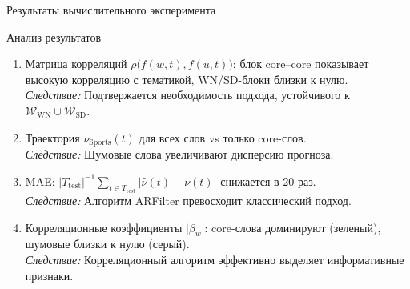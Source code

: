 \documentclass{beamer}
\begin{document}
\begin{frame}{Результаты вычислительного эксперимента}
\begin{block}{Анализ результатов}
\footnotesize
\begin{enumerate}
\item[\textbf{A.}] Матрица корреляций \(\rho\bigl(f(w,t),f(u,t)\bigr)\): блок core--core показывает высокую корреляцию с тематикой, WN/SD-блоки близки к нулю. \\
\emph{Следствие:} Подтвержается необходимость подхода, устойчивого к $\mathcal{W}_{\mathrm{WN}}\cup\mathcal{W}_{\mathrm{SD}}$.

\item[\textbf{B.}] Траектория \(\nu_{\text{Sports}}(t)\) для всех слов vs только core-слов. \\
\emph{Следствие:} Шумовые слова увеличивают дисперсию прогноза.

\item[\textbf{C.}] MAE: \(\displaystyle \lvert T_{\mathrm{test}}\rvert^{-1}\sum_{t\in T_{\mathrm{test}}}\lvert\widehat{\nu}(t)-\nu(t)\rvert\) снижается в 20 раз. \\
\emph{Следствие:} Алгоритм ARFilter превосходит классический подход.

\item[\textbf{D.}] Корреляционные коэффициенты \(\lvert\beta_w\rvert\): core-слова доминируют (зеленый), шумовые близки к нулю (серый). \\
\emph{Следствие:} Корреляционный алгоритм эффективно выделяет информативные признаки.
\end{enumerate}
\end{block}
\end{frame}

\end{document}
